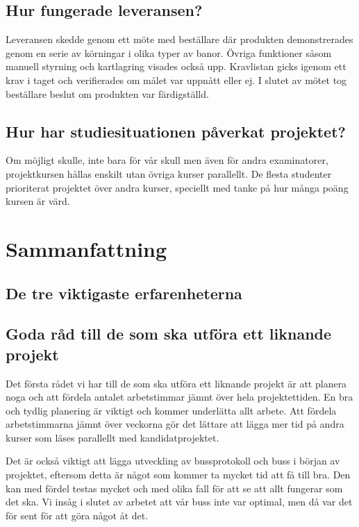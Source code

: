 \documentclass[a4paper,12pt,fleqn]{article}
\begin{document}
\subsection{Hur fungerade leveransen?}
Leveransen skedde genom ett möte med beställare där produkten demonstrerades genom en serie av körningar i olika typer av banor. Övriga funktioner såsom manuell styrning och kartlagring visades också upp. Kravlistan gicks igenom ett krav i taget och verifierades om målet var uppnått eller ej. I slutet av mötet tog beställare beslut om produkten var färdigställd. 
\subsection{Hur har studiesituationen påverkat projektet?}
Om möjligt skulle, inte bara för vår skull men även för andra examinatorer, projektkursen hållas enskilt utan övriga kurser parallellt. De flesta studenter prioriterat projektet över andra kurser, speciellt med tanke på hur många poäng kursen är värd.  

\section{Sammanfattning}
\subsection{De tre viktigaste erfarenheterna}
\subsection{Goda råd till de som ska utföra ett liknande projekt}
Det första rådet vi har till de som ska utföra ett liknande projekt är att planera noga och att fördela antalet arbetstimmar jämnt över hela projektettiden. En bra och tydlig planering är viktigt och kommer underlätta allt arbete. Att fördela arbetstimmarna jämnt över veckorna gör det lättare att lägga mer tid på andra kurser som läses parallellt med kandidatprojektet.

Det är också viktigt att lägga utveckling av bussprotokoll och buss i början av projektet, eftersom detta är något som kommer ta mycket tid att få till bra. Den kan med fördel testas mycket och med olika fall för att se att allt fungerar som det ska. Vi insåg i slutet av arbetet att vår buss inte var optimal, men då var det för sent för att göra något åt det.
\end{document}
